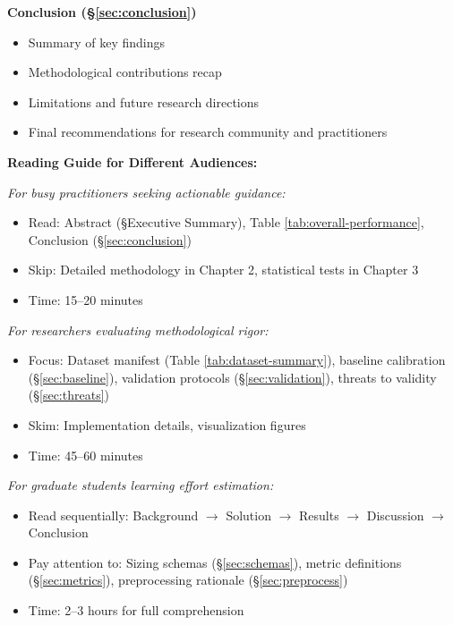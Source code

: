 \documentclass[11pt,a4paper]{article}
\begin{document}
\textbf{Conclusion (\S\ref{sec:conclusion})}
\begin{itemize}
    \item Summary of key findings
    \item Methodological contributions recap
    \item Limitations and future research directions
    \item Final recommendations for research community and practitioners
\end{itemize}

\textbf{Reading Guide for Different Audiences:}

\textit{For busy practitioners seeking actionable guidance:}
\begin{itemize}
    \item Read: Abstract (\S Executive Summary), Table \ref{tab:overall-performance}, Conclusion (\S\ref{sec:conclusion})
    \item Skip: Detailed methodology in Chapter 2, statistical tests in Chapter 3
    \item Time: 15--20 minutes
\end{itemize}

\textit{For researchers evaluating methodological rigor:}
\begin{itemize}
    \item Focus: Dataset manifest (Table \ref{tab:dataset-summary}), baseline calibration (\S\ref{sec:baseline}), validation protocols (\S\ref{sec:validation}), threats to validity (\S\ref{sec:threats})
    \item Skim: Implementation details, visualization figures
    \item Time: 45--60 minutes
\end{itemize}

\textit{For graduate students learning effort estimation:}
\begin{itemize}
    \item Read sequentially: Background $\to$ Solution $\to$ Results $\to$ Discussion $\to$ Conclusion
    \item Pay attention to: Sizing schemas (\S\ref{sec:schemas}), metric definitions (\S\ref{sec:metrics}), preprocessing rationale (\S\ref{sec:preprocess})
    \item Time: 2--3 hours for full comprehension
\end{itemize}

\newpage

\end{document}
